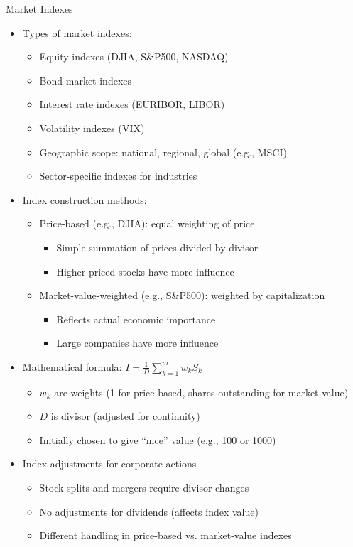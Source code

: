 \documentclass[10pt]{beamer}
\begin{document}
\begin{frame}{Market Indexes}
  \begin{itemize}[<+->]
    \item Types of market indexes:
      \begin{itemize}
        \item Equity indexes (DJIA, S\&P500, NASDAQ)
        \item Bond market indexes
        \item Interest rate indexes (EURIBOR, LIBOR)
        \item Volatility indexes (VIX)
        \item Geographic scope: national, regional, global (e.g., MSCI)
        \item Sector-specific indexes for industries
      \end{itemize}
    \item Index construction methods:
      \begin{itemize}
        \item Price-based (e.g., DJIA): equal weighting of price
          \begin{itemize}
            \item Simple summation of prices divided by divisor
            \item Higher-priced stocks have more influence
          \end{itemize}
        \item Market-value-weighted (e.g., S\&P500): weighted by capitalization
          \begin{itemize}
            \item Reflects actual economic importance
            \item Large companies have more influence
          \end{itemize}
      \end{itemize}
    \item Mathematical formula: $I = \tfrac{1}{D}\sum_{k=1}^{m} w_k S_k$
      \begin{itemize}
        \item $w_k$ are weights (1 for price-based, shares outstanding for market-value)
        \item $D$ is divisor (adjusted for continuity)
        \item Initially chosen to give ``nice'' value (e.g., 100 or 1000)
      \end{itemize}
    \item Index adjustments for corporate actions
      \begin{itemize}
        \item Stock splits and mergers require divisor changes
        \item No adjustments for dividends (affects index value)
        \item Different handling in price-based vs. market-value indexes
      \end{itemize}
  \end{itemize}
\end{frame}
\end{document}
